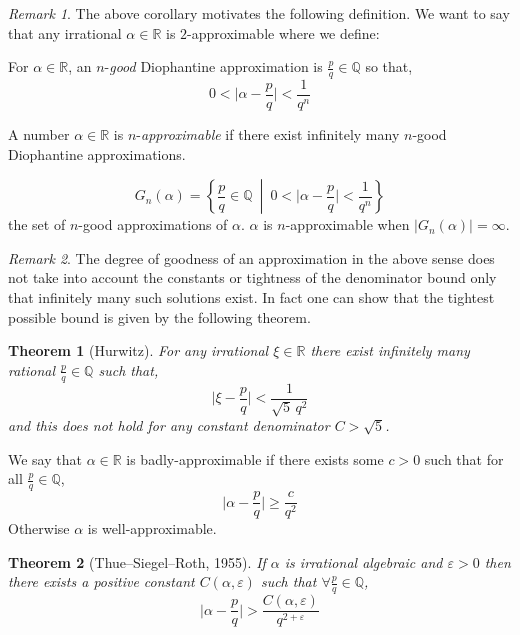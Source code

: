 \documentclass{article}
\newcommand{\Q}{\mathbb{Q}}
\newcommand{\R}{\mathbb{R}}
\newenvironment{definition}[1][Definition:]{\begin{trivlist}
\item[\hskip \labelsep {\bfseries #1}]}{\end{trivlist}}
\theoremstyle{theorem}
\newtheorem{theorem}{Theorem}[section]
\theoremstyle{definition}
\theoremstyle{definition}
\theoremstyle{remark}
\theoremstyle{definition}
\theoremstyle{remark}
\newtheorem{remark}{Remark}[subsection]
\begin{document}
\begin{remark}
The above corollary motivates the following definition. We want to say that any irrational $\alpha \in \R$ is $2$-approximable where we define:
\end{remark}

\begin{definition}
For $\alpha \in \R$, an $n$-\textit{good} Diophantine approximation is $\frac{p}{q} \in \Q$ so that, 
\[ 0 < \Big| \alpha - \frac{p}{q} \Big| < \frac{1}{q^n}\]
\end{definition}

\begin{definition}
A number $\alpha \in \R$ is $n$-\textit{approximable} if there exist infinitely many $n$-good Diophantine approximations.  
\end{definition}

\begin{definition}
\[G_n(\alpha) = \left\{ \frac{p}{q} \in \Q \: \middle| \: 0 < \Big|\alpha - \frac{p}{q} \Big| < \frac{1}{q^n} \right\}\]
the set of $n$-good approximations of $\alpha$. $\alpha$ is $n$-approximable when $|G_n(\alpha)| = \infty$.
\end{definition}

\begin{remark}
The degree of goodness of an approximation in the above sense does not take into account the constants or tightness of the denominator bound only that infinitely many such solutions exist. In fact one can show that the tightest possible bound is given by the following theorem.
\end{remark}

\begin{theorem}[Hurwitz]
For any irrational $\xi \in \R$ there exist infinitely many rational $\frac{p}{q} \in \Q$ such that,
\[ \Big| \xi - \frac{p}{q} \Big| < \frac{1}{\sqrt{5} \, q^2} \]
and this does not hold for any constant denominator $C > \sqrt{5}$. 
\end{theorem}

\begin{definition}
We say that $\alpha \in \R$ is badly-approximable if there exists some $c > 0$ such that for all $\frac{p}{q} \in \Q$,
\[ \Big| \alpha - \frac{p}{q} \Big| \ge \frac{c}{q^2} \]
Otherwise $\alpha$ is well-approximable.
\end{definition}

\begin{theorem}[Thue–Siegel–Roth, 1955]
If $\alpha$ is irrational algebraic and $\varepsilon > 0$ then there exists a positive constant $C(\alpha, \varepsilon)$ such that $\forall \frac{p}{q} \in \Q$,
\[ \Big| \alpha - \frac{p}{q} \Big| > \frac{C(\alpha, \varepsilon)}{q^{2 + \varepsilon}} \]
\end{theorem}
\end{document}
